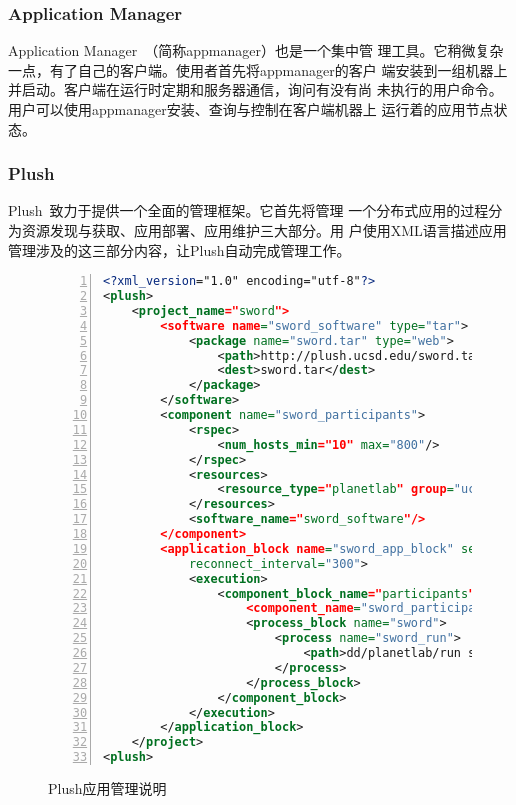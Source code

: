 \subsubsection*{Application Manager}

Application Manager~\cite{appmanager}（简称appmanager）也是一个集中管
理工具。它稍微复杂一点，有了自己的客户端。使用者首先将appmanager的客户
端安装到一组机器上并启动。客户端在运行时定期和服务器通信，询问有没有尚
未执行的用户命令。用户可以使用appmanager安装、查询与控制在客户端机器上
运行着的应用节点状态。

\subsubsection*{Plush}

Plush~\cite{fig:plush_spec}致力于提供一个全面的管理框架。它首先将管理
一个分布式应用的过程分为资源发现与获取、应用部署、应用维护三大部分。用
户使用XML语言描述应用管理涉及的这三部分内容，让Plush自动完成管理工作。

\begin{figure}
\centering
\begin{lstlisting}[language=XML,basicstyle=\small,numbers=left,
numberstyle=\tiny,tabsize=8,stringstyle=\ttfamily]
<?xml_version="1.0" encoding="utf-8"?>
<plush>
    <project_name="sword">
        <software name="sword_software" type="tar">
            <package name="sword.tar" type="web">
                <path>http://plush.ucsd.edu/sword.tar</path>
                <dest>sword.tar</dest>
            </package>
        </software>
        <component name="sword_participants">
            <rspec>
                <num_hosts_min="10" max="800"/>
            </rspec>
            <resources>
                <resource_type="planetlab" group="ucsd_sword"/>
            </resources>
            <software_name="sword_software"/>
        </component>
        <application_block name="sword_app_block" service="1"
            reconnect_interval="300">
            <execution>
                <component_block_name="participants">
                    <component_name="sword_participants"/>
                    <process_block name="sword">
                        <process name="sword_run">
                            <path>dd/planetlab/run sword</path>
                        </process>
                    </process_block>
                </component_block>
            </execution>
        </application_block>
    </project>
<plush>
\end{lstlisting}
\caption{Plush应用管理说明}
\label{fig:plush_spec}
\end{figure}


